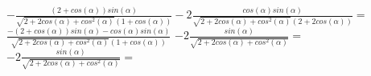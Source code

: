 \documentclass[a4paper,10pt]{article}
\begin{document}
$- \frac{\left(2 + cos\left(\alpha\right)\right) sin\left(\alpha\right)}{\sqrt{2 + 2 cos\left(\alpha\right) + cos^{2}\left(\alpha\right)} \left(1 + cos\left(\alpha\right)\right)} - 2 \frac{cos\left(\alpha\right) sin\left(\alpha\right)}{\sqrt{2 + 2 cos\left(\alpha\right) + cos^{2}\left(\alpha\right)} \left(2 + 2 cos\left(\alpha\right)\right)} =$
$\frac{- \left(2 + cos\left(\alpha\right)\right) sin\left(\alpha\right) - cos\left(\alpha\right) sin\left(\alpha\right)}{\sqrt{2 + 2 cos\left(\alpha\right) + cos^{2}\left(\alpha\right)} \left(1 + cos\left(\alpha\right)\right)} $
$- 2 \frac{sin\left(\alpha\right)}{\sqrt{2 + 2 cos\left(\alpha\right) + cos^{2}\left(\alpha\right)}} =$
$- 2 \frac{sin\left(\alpha\right)}{\sqrt{2 + 2 cos\left(\alpha\right) + cos^{2}\left(\alpha\right)}} =$
\end{document}
